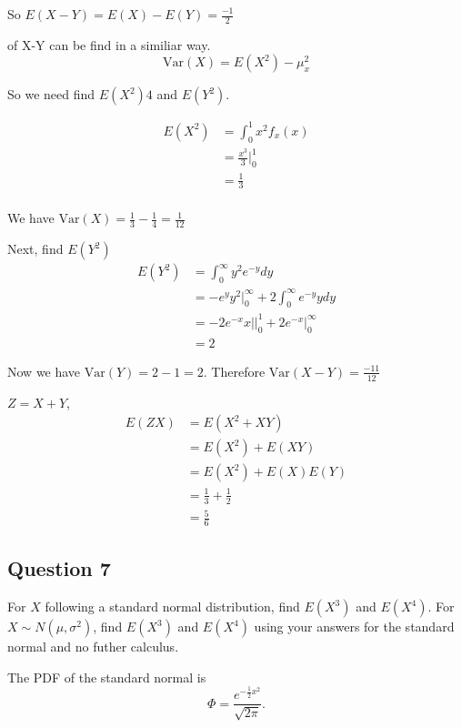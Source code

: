 \documentclass{tufte-book}
\newcommand{\Var}{\mathrm{Var}}
\theoremstyle{mytheoremstyle}
\theoremstyle{mylemstyle}
\theoremstyle{mydefstyle}
\begin{document}
\begin{enumerate}
So $E(X-Y)=E(X)-E(Y)= \frac{-1}{2}$

 of X-Y can be find in a similiar way.
\[ \Var(X) = E(X^2) - \mu_x^2 \]

So we need find $E(X^2)4$ and $E(Y^2)$.

\begin{align*}
E(X^2) &= \int_0^1x^2f_x(x)\\
&= \frac{x^3}{3}\Big|_0^1\\
&=\frac{1}{3}\\
\end{align*}

We have $\Var(X) = \frac{1}{3} - \frac{1}{4} = \frac{1}{12}$

Next, find $E(Y^2)$
\begin{align*}
E(Y^2) &= \int_0^\infty y^2e^{-y}dy\\
&= -e^yy^2\Big|_0^\infty + 2\int_0^\infty e^{-y}ydy\\
&= -2e^{-x}x|\Big|_0^1 + 2e^{-x}\Big|_0^\infty\\
&=2
\end{align*}

Now we have $\Var(Y) = 2 - 1=2$.  Therefore $\Var(X-Y)=\frac{-11}{12}$

 $Z=X+Y$,
\begin{align*}
E(ZX)&=E(X^2+XY)\\
&= E(X^2) + E(XY)\\
&= E(X^2) + E(X)E(Y)\\
&= \frac{1}{3} + \frac{1}{2}\\
&= \frac{5}{6}
\end{align*}

\end{enumerate}


\subsection{Question 7}
For $X$ following a standard normal distribution, find $E(X^3)$ and $E(X^4)$.  For $X\sim N(\mu,\sigma^2)$, find $E(X^3)$ and $E(X^4)$ using your answers for the standard normal and no futher calculus.

The PDF of the standard normal is
\[\Phi = \frac{e^{-\frac{1}{2}x^2}}{\sqrt{2\pi}}. \]
\end{document}
